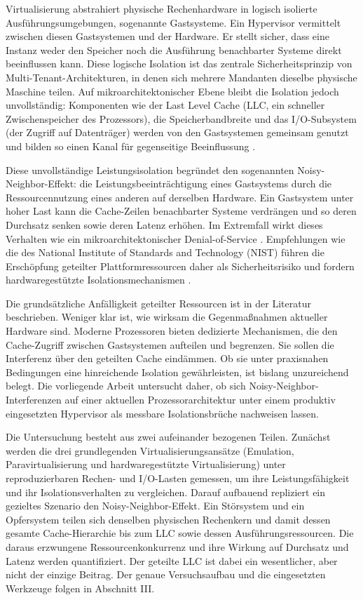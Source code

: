 \documentclass[conference]{IEEEtran}
\begin{document}
Virtualisierung abstrahiert physische Rechenhardware in logisch isolierte Ausführungsumgebungen, sogenannte Gastsysteme. Ein Hypervisor vermittelt zwischen diesen Gastsystemen und der Hardware. Er stellt sicher, dass eine Instanz weder den Speicher noch die Ausführung benachbarter Systeme direkt beeinflussen kann. Diese logische Isolation ist das zentrale Sicherheitsprinzip von Multi-Tenant-Architekturen, in denen sich mehrere Mandanten dieselbe physische Maschine teilen. Auf mikroarchitektonischer Ebene bleibt die Isolation jedoch unvollständig: Komponenten wie der Last Level Cache (LLC, ein schneller Zwischenspeicher des Prozessors), die Speicherbandbreite und das I/O-Subsystem (der Zugriff auf Datenträger) werden von den Gastsystemen gemeinsam genutzt und bilden so einen Kanal für gegenseitige Beeinflussung \cite{koh2007analysis}.

Diese unvollständige Leistungsisolation begründet den sogenannten Noisy-Neighbor-Effekt: die Leistungsbeeinträchtigung eines Gastsystems durch die Ressourcennutzung eines anderen auf derselben Hardware. Ein Gastsystem unter hoher Last kann die Cache-Zeilen benachbarter Systeme verdrängen und so deren Durchsatz senken sowie deren Latenz erhöhen. Im Extremfall wirkt dieses Verhalten wie ein mikroarchitektonischer Denial-of-Service \cite{ge2018survey}. Empfehlungen wie die des National Institute of Standards and Technology (NIST) führen die Erschöpfung geteilter Plattformressourcen daher als Sicherheitsrisiko und fordern hardwaregestützte Isolationsmechanismen \cite{nist2018hypervisor}.

Die grundsätzliche Anfälligkeit geteilter Ressourcen ist in der Literatur beschrieben. Weniger klar ist, wie wirksam die Gegenmaßnahmen aktueller Hardware sind. Moderne Prozessoren bieten dedizierte Mechanismen, die den Cache-Zugriff zwischen Gastsystemen aufteilen und begrenzen. Sie sollen die Interferenz über den geteilten Cache eindämmen. Ob sie unter praxisnahen Bedingungen eine hinreichende Isolation gewährleisten, ist bislang unzureichend belegt. Die vorliegende Arbeit untersucht daher, ob sich Noisy-Neighbor-Interferenzen auf einer aktuellen Prozessorarchitektur unter einem produktiv eingesetzten Hypervisor als messbare Isolationsbrüche nachweisen lassen.

Die Untersuchung besteht aus zwei aufeinander bezogenen Teilen. Zunächst werden die drei grundlegenden Virtualisierungsansätze (Emulation, Paravirtualisierung und hardwaregestützte Virtualisierung) unter reproduzierbaren Rechen- und I/O-Lasten gemessen, um ihre Leistungsfähigkeit und ihr Isolationsverhalten zu vergleichen. Darauf aufbauend repliziert ein gezieltes Szenario den Noisy-Neighbor-Effekt. Ein Störsystem und ein Opfersystem teilen sich denselben physischen Rechenkern und damit dessen gesamte Cache-Hierarchie bis zum LLC sowie dessen Ausführungsressourcen. Die daraus erzwungene Ressourcenkonkurrenz und ihre Wirkung auf Durchsatz und Latenz werden quantifiziert. Der geteilte LLC ist dabei ein wesentlicher, aber nicht der einzige Beitrag. Der genaue Versuchsaufbau und die eingesetzten Werkzeuge folgen in Abschnitt III.
\end{document}
